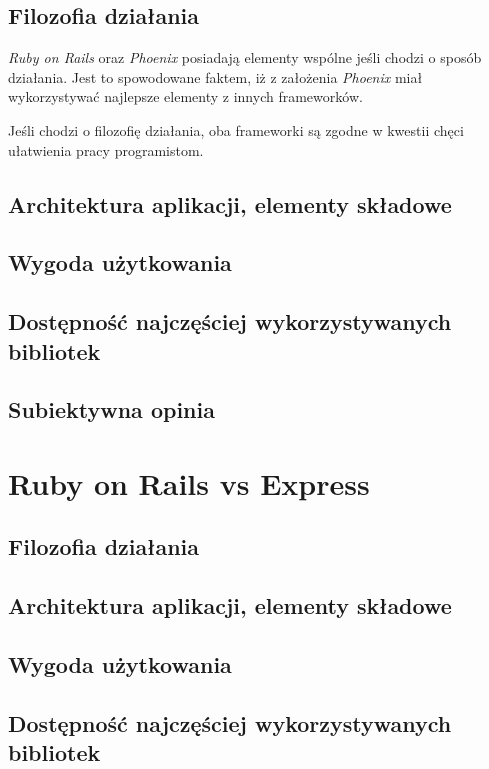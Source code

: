 \documentclass[mgr,oneside]{mgr}
\begin{document}

\subsection{Filozofia działania}
\textit{Ruby on Rails} oraz \textit{Phoenix} posiadają elementy wspólne jeśli chodzi o sposób działania. Jest to spowodowane faktem, iż z założenia \textit{Phoenix} miał wykorzystywać najlepsze elementy z innych frameworków.

Jeśli chodzi o filozofię działania, oba frameworki są zgodne w kwestii chęci ułatwienia pracy programistom. 
\subsection{Architektura aplikacji, elementy składowe}
\subsection{Wygoda użytkowania}
\subsection{Dostępność najczęściej wykorzystywanych bibliotek}
\subsection{Subiektywna opinia}

\section{Ruby on Rails vs Express}
\subsection{Filozofia działania}
\subsection{Architektura aplikacji, elementy składowe}
\subsection{Wygoda użytkowania}
\subsection{Dostępność najczęściej wykorzystywanych bibliotek}
\end{document}
